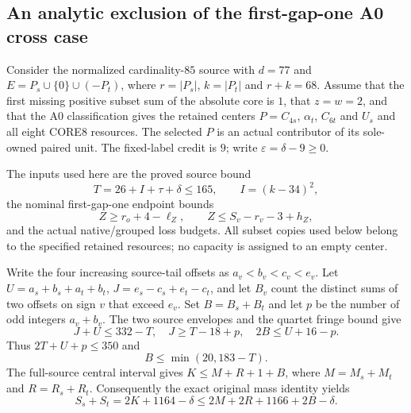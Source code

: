\subsection{An analytic exclusion of the first-gap-one A0 cross case}

Consider the normalized cardinality-$85$ source with $d=77$ and
$E=P_s\cup\{0\}\cup(-P_t)$, where $r=|P_s|$, $k=|P_t|$ and
$r+k=68$. Assume that the first missing positive subset sum of the
absolute core is $1$, that $z=w=2$, and that the A0 classification gives
the retained centers $P=C_{4s}$, $\alpha_t$, $C_{6t}$ and $U_s$ and all
eight CORE8 resources. The selected $P$ is an actual contributor of its
sole-owned paired unit. The fixed-label credit is $9$; write
$\varepsilon=\delta-9\ge0$.

The inputs used here are the proved source bound
\[
 T=26+I+\tau+\delta\le165,\qquad I=(k-34)^2,
\]
the nominal first-gap-one endpoint bounds
\[
 Z\ge r_o+4-\ell_Z,\qquad Z\le S_v-r_v-3+h_Z,
\]
and the actual native/grouped loss budgets. All subset copies used below
belong to the specified retained resources; no capacity is assigned to
an empty center.

Write the four increasing source-tail offsets as $a_v<b_v<c_v<e_v$.
Let $U=a_s+b_s+a_t+b_t$, $J=e_s-c_s+e_t-c_t$, and let $B_v$ count
the distinct sums of two offsets on sign $v$ that exceed $e_v$.
Set $B=B_s+B_t$ and let $p$ be the number of odd integers
$a_v+b_v$. The two source envelopes and the quartet fringe bound give
\[
 J+U\le332-T,\quad J\ge T-18+p,\quad
 2B\le U+16-p.
\]
Thus $2T+U+p\le350$ and
\begin{equation}\label{eq:85-cross-fringe}
 B\le\min(20,183-T).
\end{equation}
The full-source central interval gives
$K\le M+R+1+B$, where $M=M_s+M_t$ and $R=R_s+R_t$.
Consequently the exact original mass identity yields
\begin{equation}\label{eq:85-cross-source}
 S_s+S_t=2K+1164-\delta
 \le2M+2R+1166+2B-\delta.
\end{equation}

